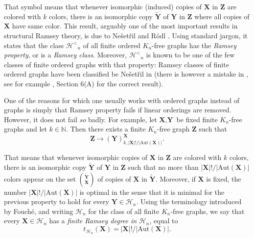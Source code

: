 \documentclass[reqno]{amsart}
\begin{document}
That symbol means that whenever isomorphic (induced) copies of ${\textbf{{X}}}$ in ${\textbf{{Z}}}$ are colored with $k$ colors, there is an isomorphic copy ${\widetilde{\textbf{{Y}}}}$ of ${\textbf{{Y}}}$ in ${\textbf{{Z}}}$ where all copies of ${\textbf{{X}}}$ have same color. This result, arguably one of the most important results in structural Ramsey theory, is due to Ne\v set\v ril and R\"odl \cite{NR}. Using standard jargon, it states that the class ${\mathcal{H}^<} _n$ of all finite ordered $K_n$-free graphs has the \emph{Ramsey property}, or is a \emph{Ramsey class}. Moreover, ${\mathcal{H}^<} _n$ is known to be one of the few classes of finite ordered graphs with that property: Ramsey classes of finite ordered graphs have been classified be Ne\v set\v ril in \cite{N} (there is however a mistake in \cite{N}, see for example \cite{KPT}, Section 6(A) for the correct result).  

One of the reasons for which one usually works with ordered graphs instead of graphs is simply that Ramsey property fails if linear orderings are removed. However, it does not fail \emph{so} badly. For example, let ${\textbf{{X}}}, {\textbf{{Y}}}$ be fixed finite $K_n$-free graphs and let $k \in {\mathbb{N}}$. Then there exists a finite $K_n$-free graph ${\textbf{{Z}}}$ such that \[ {\textbf{{Z}}} {\longrightarrow {{({\textbf{{Y}}})}}^{{{\textbf{{X}}}}}_{{k, |{\textbf{{X}}}|!/|{\mathrm{Aut}}({\textbf{{X}}})|}}}. \] 

That means that whenever isomorphic copies of ${\textbf{{X}}}$ in ${\textbf{{Z}}}$ are colored with $k$ colors, there is an isomorphic copy ${\widetilde{\textbf{{Y}}}}$ of ${\textbf{{Y}}}$ in ${\textbf{{Z}}}$ such that no more than $|{\textbf{{X}}}|!/|{\mathrm{Aut}}({\textbf{{X}}})|$ colors appear on the set $\binom{{\widetilde{\textbf{{Y}}}}}{{\textbf{{X}}}}$ of copies of ${\textbf{{X}}}$ in ${\widetilde{\textbf{{Y}}}}$. Moreover, if ${\textbf{{X}}}$ is fixed, the number $|{\textbf{{X}}}|!/|{\mathrm{Aut}}({\textbf{{X}}})|$ is optimal in the sense that it is minimal for the previous property to hold for every ${\textbf{{Y}}} \in {\mathcal{H}} _n$. Using the terminology introduced by Fouch\'e, and writing ${\mathcal{H}} _n$ for the class of all finite $K_n$-free graphs, we say that every ${\textbf{{X}}} \in {\mathcal{H}} _n$ has a \emph{finite Ramsey degree in} ${\mathcal{H}} _n$, equal to \[ t_{{\mathcal{H}} _n}({\textbf{{X}}}) = |{\textbf{{X}}}|!/|{\mathrm{Aut}}({\textbf{{X}}})|.\]
\end{document}
